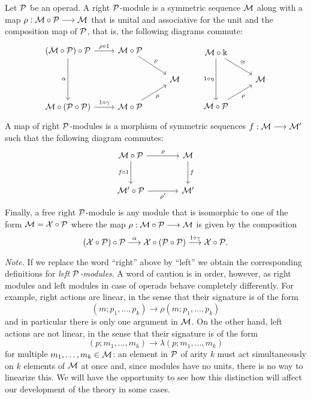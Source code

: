 \begin{definition}
Let ${\mathcal{P}}$ be an operad. A right ${\mathcal{P}}$-module is a symmetric
sequence $\mathcal M$ along with a map $\rho :\mathcal M\circ{\mathcal{P}}\longrightarrow \mathcal M$
that is unital and associative for the unit and the composition
map of ${\mathcal{P}}$, that is, the following diagrams commute:
\[
\begin{tikzcd}
(\MM\circ \PP)\circ \PP 
	\arrow[r,"\rho\circ 1"]
	\arrow[dd,"\alpha",swap] 				& \MM\circ \PP \arrow[dr,"\rho"] \\
	{} 						& {} 			& \MM\\
\MM\circ (\PP \circ \PP) \arrow[r,"1\circ\gamma"] & 
	\MM \circ \PP \arrow[ur,"\rho",swap]
\end{tikzcd}
\qquad
\begin{tikzcd}
\MM\circ \kk \arrow[dd,"1\circ\eta",swap] \arrow[dr,"\cong"] & {} \\
 {}                               &  \MM \\
\MM\circ \PP \arrow[ur,"\rho",swap]
\end{tikzcd}
\]
A map of right ${\mathcal{P}}$-modules is a morphism
of symmetric sequences $f:\mathcal M\longrightarrow \mathcal M'$ 
such that the following diagram commutes:
\[
\begin{tikzcd}[row sep = large, column sep = large]
\MM\circ \PP \arrow[r,"\rho"]
	\arrow[d,"f\circ 1",swap] & \MM \arrow[d,"f"]\\
\MM'\circ \PP \arrow[r,"\rho'",swap] & \MM'
\end{tikzcd}
\]
Finally, a free right ${\mathcal{P}}$-module is any module that is isomorphic
to one of the form $\mathcal M = \mathcal{X}\circ{\mathcal{P}}$ where the map $\rho : \mathcal M\circ{\mathcal{P}}
\longrightarrow \mathcal M$ is given by the composition
\[
(\mathcal{X}\circ {\mathcal{P}})\circ{\mathcal{P}} 
\stackrel{\alpha}{\longrightarrow}
\mathcal{X} \circ ({\mathcal{P}} \circ {\mathcal{P}}) 
	\stackrel{1\circ\gamma}{\longrightarrow} 
		\mathcal{X}\circ {\mathcal{P}}.
\]
\end{definition}

\emph{Note.} If we replace the word ``right'' above by ``left'' we obtain
the corresponding definitions for \emph{left ${\mathcal{P}}$-modules}. A word of
caution is in order, however, as right modules and left modules in
case of operads behave completely differently. For example, right
actions are linear, in the sense that their signature is of the
form
\[
(m;p_1,\ldots,p_k) \longrightarrow \rho(m;p_1,\ldots,p_k)
\] 
and in particular there is only one argument in $\mathcal M$. On the
other hand, left actions are not linear, in the sense that their
signature is of the form
\[
(p;m_1,\ldots,m_k) \longrightarrow \lambda(p;m_1,\ldots,m_k)
\] 
for multiple $m_1,\ldots,m_k\in \mathcal M$: an element in ${\mathcal{P}}$
of arity $k$ must act simultaneously on $k$ elements of $\mathcal M$
at once and, since modules have no units, there is no way
to linearize this. We will have the opportunity to see
how this distinction will affect our development of the
theory in some cases.

